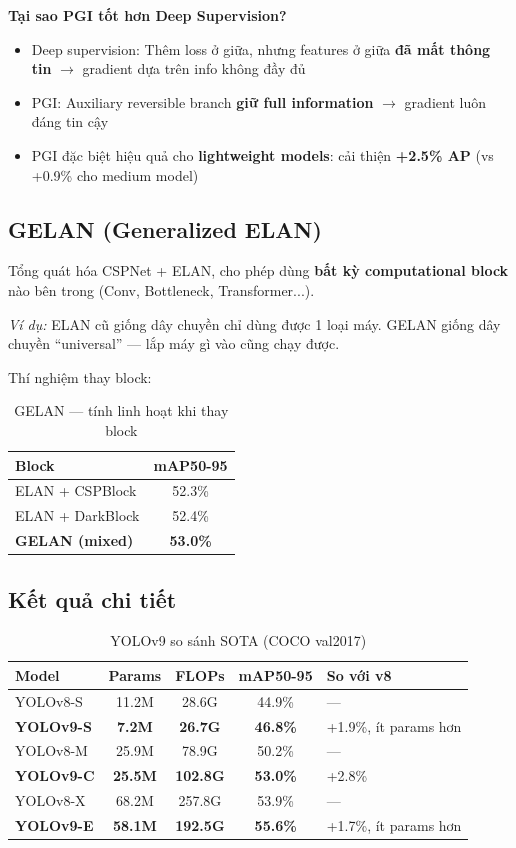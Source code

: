 \textbf{Tại sao PGI tốt hơn Deep Supervision?}
\begin{itemize}
    \item Deep supervision: Thêm loss ở giữa, nhưng features ở giữa \textbf{đã mất thông tin} $\rightarrow$ gradient dựa trên info không đầy đủ
    \item PGI: Auxiliary reversible branch \textbf{giữ full information} $\rightarrow$ gradient luôn đáng tin cậy
    \item PGI đặc biệt hiệu quả cho \textbf{lightweight models}: cải thiện \textbf{+2.5\% AP} (vs +0.9\% cho medium model)
\end{itemize}

\subsection{GELAN (Generalized ELAN)}
Tổng quát hóa CSPNet + ELAN, cho phép dùng \textbf{bất kỳ computational block} nào bên trong (Conv, Bottleneck, Transformer...).

\textit{Ví dụ:} ELAN cũ giống dây chuyền chỉ dùng được 1 loại máy. GELAN giống dây chuyền ``universal'' --- lắp máy gì vào cũng chạy được.

Thí nghiệm thay block:
\begin{table}[H]\centering
\caption{GELAN --- tính linh hoạt khi thay block}
\begin{tabular}{lc}\toprule
\textbf{Block} & \textbf{mAP50-95}\\\midrule
ELAN + CSPBlock & 52.3\% \\
ELAN + DarkBlock & 52.4\% \\
\textbf{GELAN (mixed)} & \textbf{53.0\%} \\\bottomrule
\end{tabular}
\end{table}

\subsection{Kết quả chi tiết}
\begin{table}[H]\centering
\caption{YOLOv9 so sánh SOTA (COCO val2017)}
\begin{tabular}{lcccl}\toprule
\textbf{Model} & \textbf{Params} & \textbf{FLOPs} & \textbf{mAP50-95} & \textbf{So với v8}\\\midrule
YOLOv8-S & 11.2M & 28.6G & 44.9\% & --- \\
\textbf{YOLOv9-S} & \textbf{7.2M} & \textbf{26.7G} & \textbf{46.8\%} & +1.9\%, ít params hơn \\
YOLOv8-M & 25.9M & 78.9G & 50.2\% & --- \\
\textbf{YOLOv9-C} & \textbf{25.5M} & \textbf{102.8G} & \textbf{53.0\%} & +2.8\% \\
YOLOv8-X & 68.2M & 257.8G & 53.9\% & --- \\
\textbf{YOLOv9-E} & \textbf{58.1M} & \textbf{192.5G} & \textbf{55.6\%} & +1.7\%, ít params hơn \\\bottomrule
\end{tabular}
\end{table}

